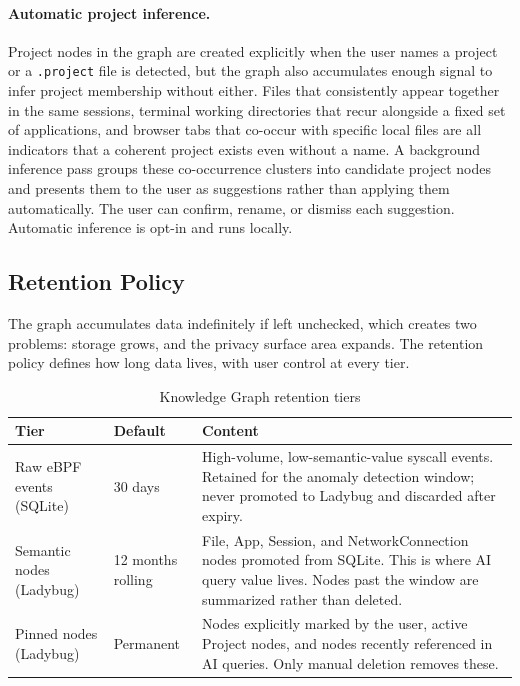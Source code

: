 \paragraph{Automatic project inference.}
Project nodes in the graph are created explicitly when the user names a
project or a \texttt{.project} file is detected, but the graph also accumulates
enough signal to infer project membership without either. Files that
consistently appear together in the same sessions, terminal working directories
that recur alongside a fixed set of applications, and browser tabs that
co-occur with specific local files are all indicators that a coherent project
exists even without a name. A background inference pass groups these
co-occurrence clusters into candidate project nodes and presents them to the
user as suggestions rather than applying them automatically. The user can
confirm, rename, or dismiss each suggestion. Automatic inference is opt-in
and runs locally.

\subsection{Retention Policy}
\label{sec:retention}

The graph accumulates data indefinitely if left unchecked, which creates two
problems: storage grows, and the privacy surface area expands. The retention
policy defines how long data lives, with user control at every tier.

\begin{table}[htbp]
\caption{Knowledge Graph retention tiers}
\label{tab:retention}
\begin{tabularx}{\linewidth}{llX}
\toprule
\textbf{Tier} & \textbf{Default} & \textbf{Content} \\
\midrule
Raw eBPF events (SQLite) &
  30 days &
  High-volume, low-semantic-value syscall events. Retained for the
  anomaly detection window; never promoted to Ladybug and discarded
  after expiry. \\
Semantic nodes (Ladybug) &
  12 months rolling &
  File, App, Session, and NetworkConnection nodes promoted from SQLite.
  This is where AI query value lives. Nodes past the window
  are summarized rather than deleted. \\
Pinned nodes (Ladybug) &
  Permanent &
  Nodes explicitly marked by the user, active Project nodes, and nodes
  recently referenced in AI queries. Only manual deletion removes these. \\
\bottomrule
\end{tabularx}
\end{table}


